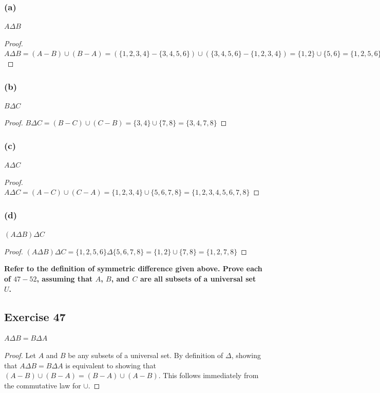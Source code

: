 \documentclass[14pt]{extarticle}
\newcommand{\cy}{\color{cyan}}
\begin{document}
\subsubsection{(a)}
\(A \Delta B\)

\begin{proof}
\(A \Delta B = (A - B) \cup (B - A) = (\{1,2,3,4\} - \{3,4,5,6\}) \cup (\{3,4,5,6\} - \{1,2,3,4\}) =
\{1,2\} \cup \{5,6\} = \{1,2,5,6\}\)
\end{proof}

\subsubsection{(b)}
\(B \Delta C\)

\begin{proof}
\(B \Delta C = (B - C) \cup (C - B) = \{3,4\} \cup \{7,8\} = \{3,4,7,8\}\)
\end{proof}

\subsubsection{(c)}
\(A \Delta C\)

\begin{proof}
\(A \Delta C = (A - C) \cup (C - A) = \{1,2,3,4\} \cup \{5,6,7,8\} = \{1,2,3,4,5,6,7,8\}\)
\end{proof}

\subsubsection{(d)}
\((A \Delta B) \Delta C\)

\begin{proof}
\((A \Delta B) \Delta C = \{1,2,5,6\} \Delta \{5,6,7,8\} = \{1,2\} \cup \{7,8\} = \{1,2,7,8\}\)
\end{proof}

{\bf \cy Refer to the definition of symmetric difference given above. Prove each of $47-52$, assuming that $A$, $B$, 
and $C$ are all subsets of a universal set $U$.}

\subsection{Exercise 47}
\(A \Delta B = B \Delta A\)

\begin{proof}
Let $A$ and $B$ be any subsets of a universal set. By
definition of $\Delta$, showing that \(A \Delta B = B 
\Delta A\) is equivalent to showing that \((A - B) \cup (B - A) = (B - A) \cup (A - B)\). This follows immediately 
from the commutative law for $\cup$.
\end{proof}
\end{document}
